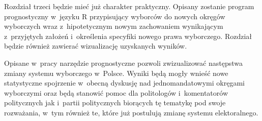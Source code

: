 Rozdział trzeci będzie mieć już charakter praktyczny. Opisany zostanie program prognostyczny w~języku R przypisujący wyborców do nowych okręgów wyborczych wraz z~hipotetycznym nowym zachowaniem wynikającym z~przyjętych założeń i~określenia specyfiki nowego prawa wyborczego. Rozdział będzie również zawierać wizualizację uzyskanych wyników.

Opisane w~pracy narzędzie prognostyczne pozwoli zwizualizować następstwa zmiany systemu wyborczego w~Polsce. Wyniki będą mogły wnieść nowe statystyczne spojrzenie w~obecną dyskusję nad jednomandatowymi okręgami wyborczymi oraz będą stanowić pomoc dla politologów i~komentatorów politycznych jak i~partii politycznych biorących tę tematykę pod swoje rozważania, w~tym również te, które już postulują zmianę systemu elektoralnego.

